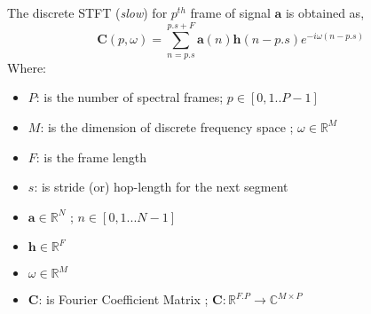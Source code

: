 \noindent The discrete STFT (\textit{slow}) for $p^{th}$ frame of signal $\textbf{a}$ is obtained as,
\begin{equation}
\label{stfteq}
\textbf{C}(p, \omega ) = \displaystyle\sum_{n=p.s}^{p.s + F}\textbf{a}(n)\textbf{h}(n-p.s)e^{-i \omega (n-p.s)}
\end{equation}
Where:
\begin{itemize}[label=]
    \setlength\itemsep{0em}
    \item $P$: is the number of spectral frames; $p \in [0,1..P-1]$ 
    \item $M$: is the dimension of discrete frequency space ; $\omega \in \mathbb{R}^{M}$
    \item $F$: is the frame length 
    \item $s$: is stride (or) hop-length for the next segment
    \item $\textbf{a} \in  \mathbb{R}^{N}$ ; $n \in [0,1...N-1]$
    \item $\textbf{h} \in  \mathbb{R}^{F}$
    \item $\omega \in  \mathbb{R}^{M}$
    \item $\textbf{C}$: is Fourier Coefficient Matrix ; $\textbf{C} : \mathbb{R}^{F.P} \rightarrow \mathbb{C}^{M \times P}$
\end{itemize}

